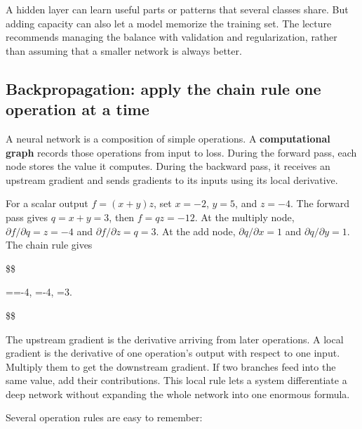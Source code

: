 A hidden layer can learn useful parts or patterns that several classes share. But adding capacity can also let a model memorize the training set. The lecture recommends managing the balance with validation and regularization, rather than assuming that a smaller network is always better.

\subsection{Backpropagation: apply the chain rule one operation at a time}\label{04-visual-computing-ii-ch031-backpropagation-apply-the-chain-rule-one-operation-at-a-time}

A neural network is a composition of simple operations. A \textbf{computational graph} records those operations from input to loss. During the forward pass, each node stores the value it computes. During the backward pass, it receives an upstream gradient and sends gradients to its inputs using its local derivative.

For a scalar output \(f=(x+y)z\), set \(x=-2\), \(y=5\), and \(z=-4\). The forward pass gives \(q=x+y=3\), then \(f=qz=-12\). At the multiply node, \(\partial f/\partial q=z=-4\) and \(\partial f/\partial z=q=3\). At the add node, \(\partial q/\partial x=1\) and \(\partial q/\partial y=1\). The chain rule gives

\$\$

==-4, \quad {}=-4, \quad {}=3.

\$\$

The upstream gradient is the derivative arriving from later operations. A local gradient is the derivative of one operation's output with respect to one input. Multiply them to get the downstream gradient. If two branches feed into the same value, add their contributions. This local rule lets a system differentiate a deep network without expanding the whole network into one enormous formula.

Several operation rules are easy to remember:

